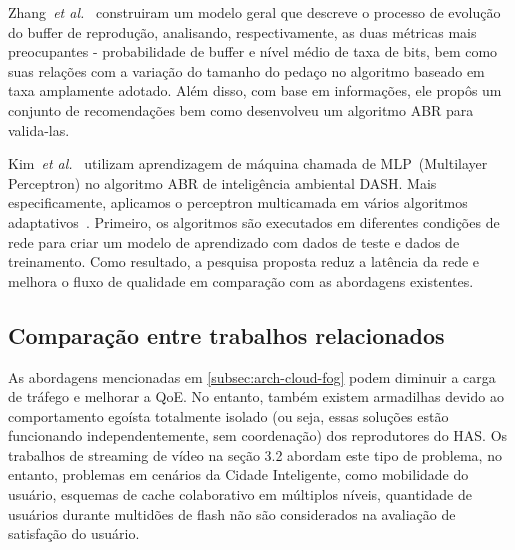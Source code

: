 Zhang~\textit{et al.}~\cite{zhangINFOCOM17} 
construiram um modelo geral que descreve o processo de evolução do buffer de reprodução, analisando, respectivamente, as duas métricas mais preocupantes - probabilidade de buffer e nível médio de taxa de bits, bem como suas relações com a variação do tamanho do pedaço no algoritmo baseado em taxa amplamente adotado. 
Além disso, com base em informações, ele propôs um conjunto de recomendações bem como desenvolveu um algoritmo ABR para valida-las.

Kim~\textit{et al.}~\cite{Kim2018}
utilizam aprendizagem de máquina chamada de MLP~(Multilayer Perceptron) no algoritmo ABR de inteligência ambiental DASH. Mais especificamente, aplicamos o perceptron multicamada em vários algoritmos adaptativos~\cite{Vergados2016SysJ}. Primeiro, os algoritmos são executados em diferentes condições de rede para criar um modelo de aprendizado com dados de teste e dados de treinamento. 
Como resultado, a pesquisa proposta reduz a latência da rede e melhora o fluxo de qualidade em comparação com as abordagens existentes.

\subsection{Comparação entre trabalhos relacionados}
\label{subsec:applications}

As abordagens mencionadas em \autoref{subsec:arch-cloud-fog} podem diminuir a carga de tráfego e melhorar a QoE. No entanto, também existem armadilhas devido ao comportamento egoísta totalmente isolado (ou seja, essas soluções estão funcionando independentemente, sem coordenação) dos reprodutores do HAS. %
Os trabalhos de streaming de vídeo na seção 3.2 abordam este tipo de problema, no entanto, problemas em cenários da Cidade Inteligente, como mobilidade do usuário, esquemas de cache colaborativo em múltiplos níveis, quantidade de usuários durante multidões de flash não são considerados na avaliação de satisfação do usuário. %

